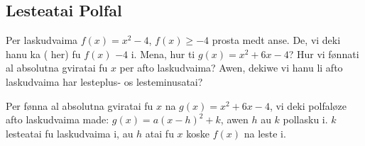 \subsection{Lesteatai Polfal}
Per laskudvaima \(f\left(x\right) = x^2-4\), \(f\left(x\right)\geq-4\) prosta medt anse. De, vi deki hanu
ka  ( her) fu \(f\left(x\right)\) \(-4\) i. Mena, hur ti
\(g\left(x\right) = x^2+6x-4\)? Hur vi fønnati al absolutna gviratai fu \(x\) per afto laskudvaima?
Awen, dekiwe vi hanu li afto laskudvaima har lesteplus- os lesteminusatai?

Per fønna al absolutna gviratai fu \(x\) na \(g\left(x\right)=x^2+6x-4\), vi deki polfaløze afto
laskudvaima  made: \(g\left(x\right) = a{\left(x-h\right)}^2+k\), awen
\(h\) au \(k\) pollasku i. \(k\) lesteatai fu laskudvaima i, au \(h\) atai fu \(x\) koske \(f\left(x\right)\)
na leste i.
